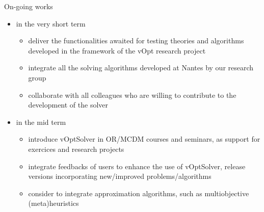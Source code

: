 \documentclass[10pt,xcolor=dvipsnames]{beamer}
\begin{document}
\begin{frame}{On-going works}

\begin{itemize}

\item in the very short term 
\begin{itemize}
    \item deliver the functionalities awaited for testing theories and algorithms developed in the framework of the vOpt research project
             \smallskip
    \item integrate all the solving algorithms developed at Nantes by our research group    
             \smallskip
    \item collaborate with all colleagues who are willing to contribute to the  development of the solver
 \end{itemize}    
\medskip

\item in the mid term 
\begin{itemize}
    \item introduce vOptSolver in OR/MCDM courses and seminars, as support for exercices and research projects
              \smallskip
    \item integrate feedbacks of users to enhance the use of vOptSolver, release versions incorporating new/improved problems/algorithms    
                  \smallskip
    \item consider to integrate approximation algorithms, such as multiobjective (meta)heuristics
 \end{itemize}  
    
\end{itemize}

\end{frame}

\end{document}
